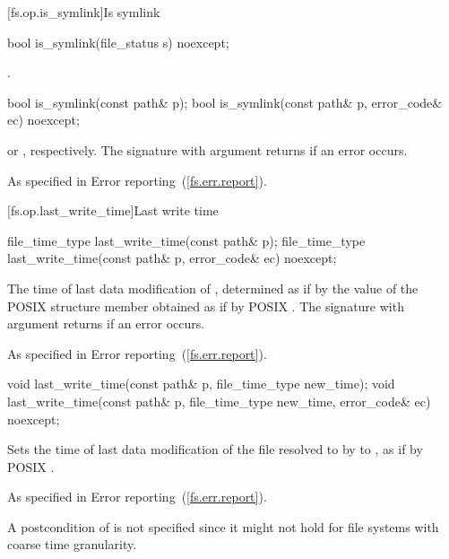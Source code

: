 [fs.op.is_symlink]{Is symlink}

\begin{itemdecl}
bool is_symlink(file_status s) noexcept;
\end{itemdecl}

\begin{itemdescr}
\pnum
\returns {}.
\end{itemdescr}

\begin{itemdecl}
bool is_symlink(const path& p);
bool is_symlink(const path& p, error_code& ec) noexcept;
\end{itemdecl}

\begin{itemdescr}
\pnum
\returns {} or ,
  respectively. The signature with argument  returns 
  if an error occurs.

\pnum
\throws As specified in Error reporting~(\ref{fs.err.report}).
\end{itemdescr}


[fs.op.last_write_time]{Last write time}

\begin{itemdecl}
file_time_type last_write_time(const path& p);
file_time_type last_write_time(const path& p, error_code& ec) noexcept;
\end{itemdecl}

\begin{itemdescr}
\pnum
\returns The time of last data modification of ,
  determined as if by the value of the POSIX  structure member 
  obtained as if by POSIX .
  The signature with argument  returns 
  if an error occurs.

\pnum
\throws As specified in Error reporting~(\ref{fs.err.report}).
\end{itemdescr}

\begin{itemdecl}
void last_write_time(const path& p, file_time_type new_time);
void last_write_time(const path& p, file_time_type new_time,
                     error_code& ec) noexcept;
\end{itemdecl}

\begin{itemdescr}
\pnum
\effects Sets the time of last data modification of the file
  resolved to by  to , as if by POSIX .

\pnum
\throws As specified in Error reporting~(\ref{fs.err.report}).

\pnum
\begin{note} A postcondition of  is not specified since it might not hold for file systems
  with coarse time granularity. \end{note}
\end{itemdescr}

